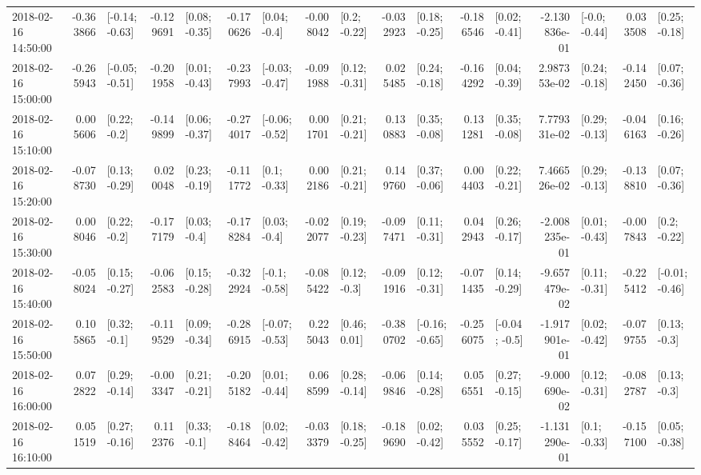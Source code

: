 \begin{tabular}{lrlrlrlrlrlrlrlrl}
2018-02-16 14:50:00 & -0.363866 &  [-0.14; -0.63] & -0.129691 &   [0.08; -0.35] & -0.170626 &    [0.04; -0.4] & -0.008042 &    [0.2; -0.22] & -0.032923 &   [0.18; -0.25] & -0.186546 &   [0.02; -0.41] & -2.130836e-01 &   [-0.0; -0.44] &  0.033508 &   [0.25; -0.18] \\
2018-02-16 15:00:00 & -0.265943 &  [-0.05; -0.51] & -0.201958 &   [0.01; -0.43] & -0.237993 &  [-0.03; -0.47] & -0.091988 &   [0.12; -0.31] &  0.025485 &   [0.24; -0.18] & -0.164292 &   [0.04; -0.39] &  2.987353e-02 &   [0.24; -0.18] & -0.142450 &   [0.07; -0.36] \\
2018-02-16 15:10:00 &  0.005606 &    [0.22; -0.2] & -0.149899 &   [0.06; -0.37] & -0.274017 &  [-0.06; -0.52] &  0.001701 &   [0.21; -0.21] &  0.130883 &   [0.35; -0.08] &  0.131281 &   [0.35; -0.08] &  7.779331e-02 &   [0.29; -0.13] & -0.046163 &   [0.16; -0.26] \\
2018-02-16 15:20:00 & -0.078730 &   [0.13; -0.29] &  0.020048 &   [0.23; -0.19] & -0.111772 &    [0.1; -0.33] &  0.002186 &   [0.21; -0.21] &  0.149760 &   [0.37; -0.06] &  0.004403 &   [0.22; -0.21] &  7.466526e-02 &   [0.29; -0.13] & -0.138810 &   [0.07; -0.36] \\
2018-02-16 15:30:00 &  0.008046 &    [0.22; -0.2] & -0.177179 &    [0.03; -0.4] & -0.178284 &    [0.03; -0.4] & -0.022077 &   [0.19; -0.23] & -0.097471 &   [0.11; -0.31] &  0.042943 &   [0.26; -0.17] & -2.008235e-01 &   [0.01; -0.43] & -0.007843 &    [0.2; -0.22] \\
2018-02-16 15:40:00 & -0.058024 &   [0.15; -0.27] & -0.062583 &   [0.15; -0.28] & -0.322924 &   [-0.1; -0.58] & -0.085422 &    [0.12; -0.3] & -0.091916 &   [0.12; -0.31] & -0.071435 &   [0.14; -0.29] & -9.657479e-02 &   [0.11; -0.31] & -0.225412 &  [-0.01; -0.46] \\
2018-02-16 15:50:00 &  0.105865 &    [0.32; -0.1] & -0.119529 &   [0.09; -0.34] & -0.286915 &  [-0.07; -0.53] &  0.225043 &    [0.46; 0.01] & -0.380702 &  [-0.16; -0.65] & -0.256075 &   [-0.04; -0.5] & -1.917901e-01 &   [0.02; -0.42] & -0.079755 &    [0.13; -0.3] \\
2018-02-16 16:00:00 &  0.072822 &   [0.29; -0.14] & -0.003347 &   [0.21; -0.21] & -0.205182 &   [0.01; -0.44] &  0.068599 &   [0.28; -0.14] & -0.069846 &   [0.14; -0.28] &  0.056551 &   [0.27; -0.15] & -9.000690e-02 &   [0.12; -0.31] & -0.082787 &    [0.13; -0.3] \\
2018-02-16 16:10:00 &  0.051519 &   [0.27; -0.16] &  0.112376 &    [0.33; -0.1] & -0.188464 &   [0.02; -0.42] & -0.033379 &   [0.18; -0.25] & -0.189690 &   [0.02; -0.42] &  0.035552 &   [0.25; -0.17] & -1.131290e-01 &    [0.1; -0.33] & -0.157100 &   [0.05; -0.38] \\

\end{tabular}
